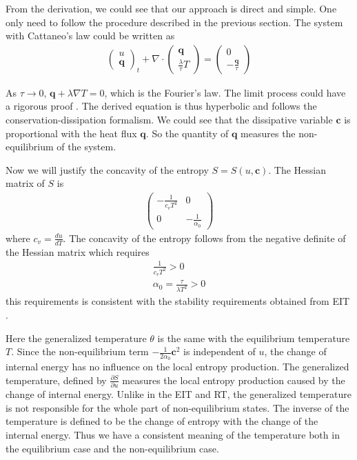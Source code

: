 \documentclass[a4paper]{article}
\begin{document}
From the derivation, we could see that our approach is direct and simple. One only need to follow the procedure described in the previous section. The system with Cattaneo's law could be written as
\begin{eqnarray}
\left( \begin{array}{ll} u \\ \mathbf{q} \end{array} \right)_t + \nabla \cdot \left( \begin{array}{ll} \mathbf{q} \\ \frac{\lambda}{\tau} T \end{array} \right) =\left( \begin{array}{ll} 0 \\ -\frac{\mathbf{q}}{\tau} \end{array} \right) 
\end{eqnarray}

As $\tau \rightarrow 0$, $\mathbf{q}+\lambda \nabla T=0$, which is the Fourier's law. The limit process could have a rigorous proof \cite{yong2008interesting}.
The derived equation is thus hyperbolic and follows the conservation-dissipation formalism. We could see that the dissipative variable $\mathbf{c}$ is proportional with the heat flux $\mathbf{q}$. So the quantity of  $\mathbf{q}$ measures the non-equilibrium of the system.

Now we will justify the concavity of the entropy $S=S(u,\mathbf{c})$. The Hessian matrix of $S$ is
\begin{eqnarray}
\left( \begin{array}{ll} -\frac{1}{c_v T^2} & 0 \\ 0 & -\frac{1}{\alpha_0} \end{array} \right)
\end{eqnarray}
where $c_v=\frac{d u}{d T}$.
The concavity of the entropy follows from the negative definite of the Hessian matrix which requires 
\begin{eqnarray}
\frac{1}{c_v T^2}>0 \\
\alpha_0=\frac{\tau}{\lambda T^2}>0
\end{eqnarray}
this requirements is consistent with the stability requirements obtained from EIT \cite{EIT}.

Here the generalized temperature $\theta$ is the same with the equilibrium temperature $T$. Since the non-equilibrium term $-\frac{1}{2\alpha_0}\mathbf{c}^2$ is independent of $u$, the change of internal energy has no influence on the local entropy production. The generalized temperature, defined by $\frac{\partial S}{\partial u}$ measures the local entropy production caused by the change of internal energy. Unlike in the EIT and RT, the generalized temperature is not responsible for the whole part of non-equilibrium states. The inverse of the temperature is defined to be the change of entropy with the change of the internal energy. Thus we have a consistent meaning of the temperature both in the equilibrium case and the non-equilibrium case.
\end{document}
